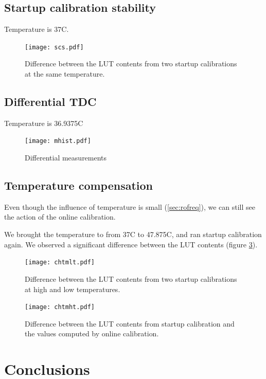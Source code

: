 \documentclass[a4paper,11pt]{article}
\begin{document}
\subsection{Startup calibration stability}
Temperature is 37\degree C.

\begin{figure}[h]
\texttt{[image: scs.pdf]}
\caption{Difference between the LUT contents from two startup calibrations at the same temperature.}
\label{fig:scs}
\end{figure}

\subsection{Differential TDC}

Temperature is 36.9375\degree C
\begin{figure}[h]
\texttt{[image: mhist.pdf]}
\caption{Differential measurements}
\label{fig:mhistll}
\end{figure}

\subsection{Temperature compensation}
Even though the influence of temperature is small (\ref{sec:rofreq}), we can still see the action of the online calibration.

We brought the temperature to from 37\degree C to 47.875\degree C, and ran startup calibration again. We observed a significant difference between the LUT contents (figure \ref{fig:chtmlt}).

\begin{figure}[h]
\texttt{[image: chtmlt.pdf]}
\caption{Difference between the LUT contents from two startup calibrations at high and low temperatures.}
\label{fig:chtmlt}
\end{figure}

\begin{figure}[h]
\texttt{[image: chtmht.pdf]}
\caption{Difference between the LUT contents from startup calibration and the values computed by online calibration.}
\label{fig:chtmht}
\end{figure}

\section{Conclusions}
\end{document}
